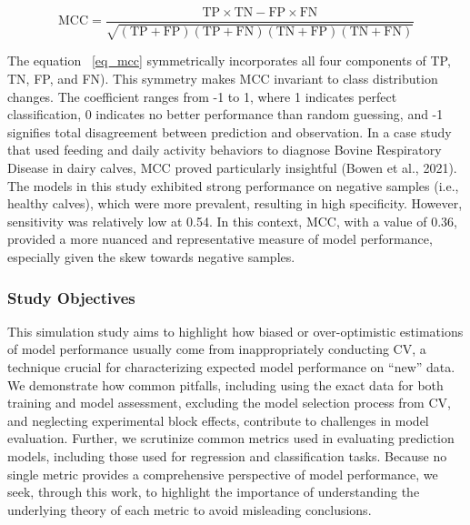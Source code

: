 \begin{equation} \label{eq_mcc}
    \text{MCC} = \frac{\text{TP} \times \text{TN} - \text{FP} \times \text{FN}}{\sqrt{(\text{TP} + \text{FP})(\text{TP} + \text{FN})(\text{TN} + \text{FP})(\text{TN} + \text{FN})}}
\end{equation}

The equation ~\ref{eq_mcc} symmetrically incorporates all four components of TP, TN, FP, and FN). This symmetry makes MCC invariant to class distribution changes. The coefficient ranges from -1 to 1, where 1 indicates perfect classification, 0 indicates no better performance than random guessing, and -1 signifies total disagreement between prediction and observation. In a case study that used feeding and daily activity behaviors to diagnose Bovine Respiratory Disease in dairy calves, MCC proved particularly insightful (Bowen et al., 2021). The models in this study exhibited strong performance on negative samples (i.e., healthy calves), which were more prevalent, resulting in high specificity. However, sensitivity was relatively low at 0.54. In this context, MCC, with a value of 0.36, provided a more nuanced and representative measure of model performance, especially given the skew towards negative samples.


\subsubsection{Study Objectives}

This simulation study aims to highlight how biased or over-optimistic estimations of model performance usually come from inappropriately conducting CV, a technique crucial for characterizing expected model performance on “new” data. We demonstrate how common pitfalls, including using the exact data for both training and model assessment, excluding the model selection process from CV, and neglecting experimental block effects, contribute to challenges in model evaluation. Further, we scrutinize common metrics used in evaluating prediction models, including those used for regression and classification tasks. Because no single metric provides a comprehensive perspective of model performance, we seek, through this work, to highlight the importance of understanding the underlying theory of each metric to avoid misleading conclusions.

